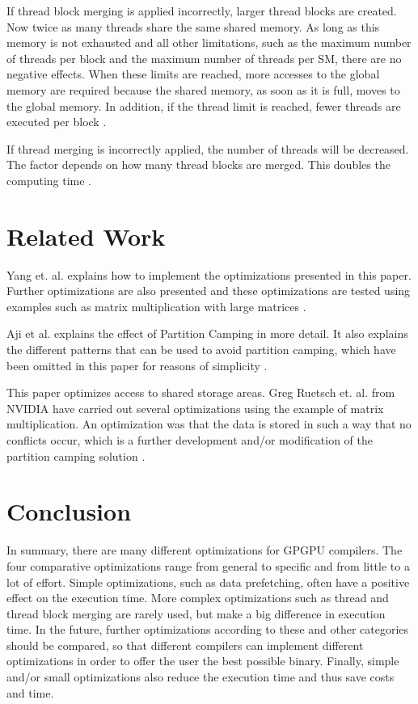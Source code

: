 \documentclass[conference]{IEEEtran}
\begin{document}
		If thread block merging is applied incorrectly, larger thread blocks are created. Now twice as many threads share the same shared memory. As long as this memory is not exhausted and all other limitations, such as the maximum number of threads per block and the maximum number of threads per SM, there are no negative effects. When these limits are reached, more accesses to the global memory are required because the shared memory, as soon as it is full, moves to the global memory. In addition, if the thread limit is reached, fewer threads are executed per block \cite{torres2011understanding}.
		
		If thread merging is incorrectly applied, the number of threads will be decreased. The factor depends on how many thread blocks are merged. This doubles the computing time \cite{torres2011understanding}. 

	
	
\section{Related Work}

	Yang et. al. explains how to implement the optimizations presented in this paper. Further optimizations are also presented and these optimizations are tested using examples such as matrix multiplication with large matrices \cite{yang2010gpgpu}.
	
	Aji et al. explains the effect of Partition Camping in more detail. It also explains the different patterns that can be used to avoid partition camping, which have been omitted in this paper for reasons of simplicity \cite{aji2011bounding}.  
	
	This paper optimizes access to shared storage areas.  Greg Ruetsch et. al. from NVIDIA have carried out several optimizations using the example of matrix multiplication. An optimization was that the data is stored in such a way that no conflicts occur, which is a further development and/or modification of the partition camping solution \cite{ruetsch2009optimizing}.
	
\section{Conclusion}

	In summary, there are many different optimizations for GPGPU compilers. The four comparative optimizations range from general to specific and from little to a lot of effort. Simple optimizations, such as data prefetching, often have a positive effect on the execution time. More complex optimizations such as thread and thread block merging are rarely used, but make a big difference in execution time.  In the future, further optimizations according to these and other categories should be compared, so that different compilers can implement different optimizations in order to offer the user the best possible binary. Finally, simple and/or small optimizations also reduce the execution time and thus save costs and time.
	




\end{document}
